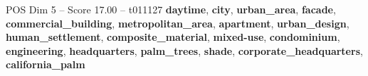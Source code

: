 \begin{textsample}{POS Dim 5 – Score 17.00 – t011127}  \label{ex:f5_pos_021}
\textbf{daytime}, \textbf{city}, \textbf{urban\_area}, \textbf{facade}, \textbf{commercial\_building}, \textbf{metropolitan\_area}, \textbf{apartment}, \textbf{urban\_design}, \textbf{human\_settlement}, \textbf{composite\_material}, \textbf{mixed-use}, \textbf{condominium}, \textbf{engineering}, \textbf{headquarters}, \textbf{palm\_trees}, \textbf{shade}, \textbf{corporate\_headquarters}, \textbf{california\_palm}

\end{textsample}

